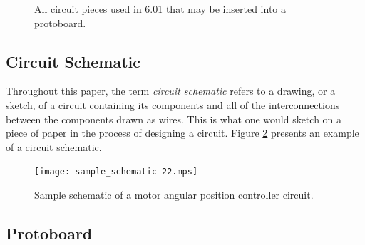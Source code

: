 \begin{figure}
\begin{center}
\hspace{3cm}
\caption[Circuit pieces]{All circuit pieces used in 6.01 that may be
inserted into a protoboard.}
\label{fig:components}
\end{center}
\end{figure}

\subsection{Circuit Schematic}

Throughout this paper, the term \textit{circuit schematic} refers to a
drawing, or a sketch, of a circuit containing its components and all of the
interconnections between the components drawn as wires. This is what one would
sketch on a piece of paper in the process of designing a circuit. Figure
\ref{fig:schematic} presents an example of a circuit schematic.

\begin{figure}
\begin{center}
\texttt{[image: sample\_schematic-22.mps]}
\caption[Sample circuit schematic]{Sample schematic of a motor angular position
controller circuit.}
\label{fig:schematic}
\end{center}
\end{figure}

\subsection{Protoboard}
\label{sec:what_is_protoboard}

